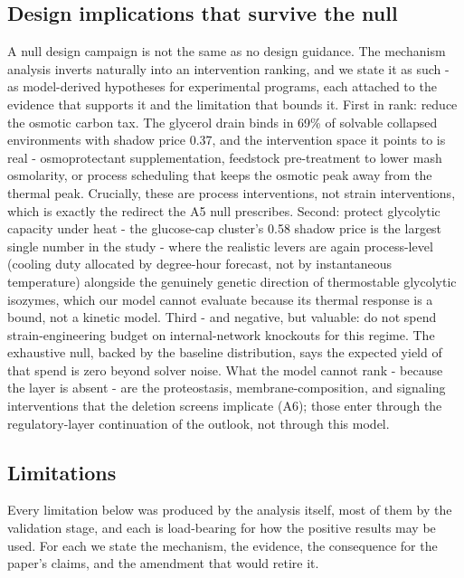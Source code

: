 \documentclass[12pt]{article}
\begin{document}
\subsection{Design implications that survive the null}

A null design campaign is not the same as no design guidance. The
mechanism analysis inverts naturally into an intervention ranking,
and we state it as such - as model-derived hypotheses for
experimental programs, each attached to the evidence that supports it
and the limitation that bounds it. First in rank: reduce the osmotic
carbon tax. The glycerol drain binds in 69\% of solvable collapsed
environments with shadow price 0.37, and the intervention space it
points to is real - osmoprotectant supplementation, feedstock
pre-treatment to lower mash osmolarity, or process scheduling that
keeps the osmotic peak away from the thermal peak. Crucially, these
are process interventions, not strain interventions, which is exactly
the redirect the A5 null prescribes. Second: protect glycolytic
capacity under heat - the glucose-cap cluster's 0.58 shadow price is
the largest single number in the study - where the realistic levers
are again process-level (cooling duty allocated by degree-hour
forecast, not by instantaneous temperature) alongside the genuinely
genetic direction of thermostable glycolytic isozymes, which our
model cannot evaluate because its thermal response is a bound, not a
kinetic model. Third - and negative, but valuable: do not spend
strain-engineering budget on internal-network knockouts for this
regime. The exhaustive null, backed by the baseline distribution,
says the expected yield of that spend is zero beyond solver noise.
What the model cannot rank - because the layer is absent - are the
proteostasis, membrane-composition, and signaling interventions that
the deletion screens implicate (A6); those enter through the
regulatory-layer continuation of the outlook, not through this model.

\subsection{Limitations}

Every limitation below was produced by the analysis itself, most of
them by the validation stage, and each is load-bearing for how the
positive results may be used. For each we state the mechanism, the
evidence, the consequence for the paper's claims, and the amendment
that would retire it.
\end{document}
